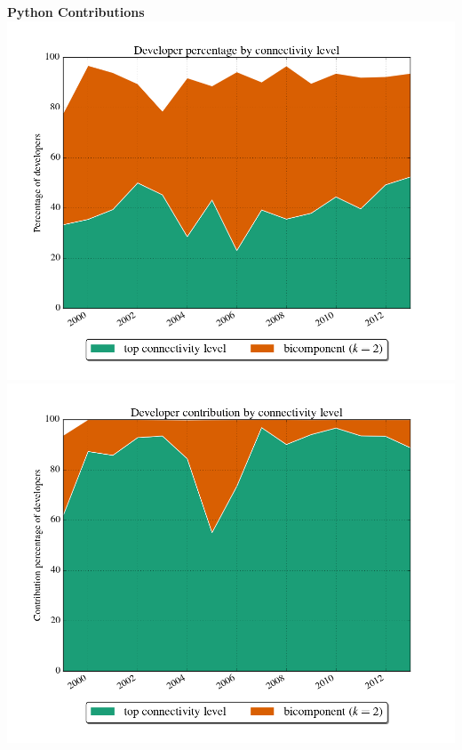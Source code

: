 \documentclass[ignorenonframetext,red,8pt,notes=show]{beamer}
\begin{document}
\begin{frame}
\begin{columns}[c]
\begin{column}{0.5\textwidth}
\begin{center}
\textbf{Python Contributions}
\includegraphics[scale=0.16]{../../figures/evolution_developers_python_years}
\newline
\includegraphics[scale=0.16]{../../figures/evolution_connectivity_python_years}
\end{center}
\end{column}
\end{columns}
\end{frame}
\end{document}
